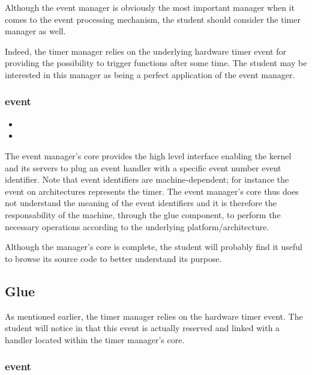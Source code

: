 Although the event manager is obviously the most important manager when
it comes to the event processing mechanism, the student should consider
the timer manager as well.

Indeed, the timer manager relies on the underlying hardware timer event
for providing the possibility to trigger functions after some time. The
student may be interested in this manager as being a perfect application
of the event manager.

\subsubsection*{event}

\begin{itemize}
  \item
  \item
\end{itemize}

The event manager's core provides the high level interface enabling the kernel
and its servers to plug an event handler with a specific event number \ie{}
event identifier. Note that event identifiers are machine-dependent; for
instance the event  on  architectures represents the
timer. The event manager's core thus does not understand the meaning of the
event identifiers and it is therefore the responsability of the machine,
through the glue component, to perform the necessary operations according
to the underlying platform/architecture.

Although the manager's core is complete, the student will probably find it
useful to browse its source code to better understand its purpose.

\subsection{Glue}

As mentioned earlier, the timer manager relies on the hardware timer event.
The student will notice in
 that this
event is actually reserved and linked with a handler located within the
timer manager's core.

\subsubsection*{event}

